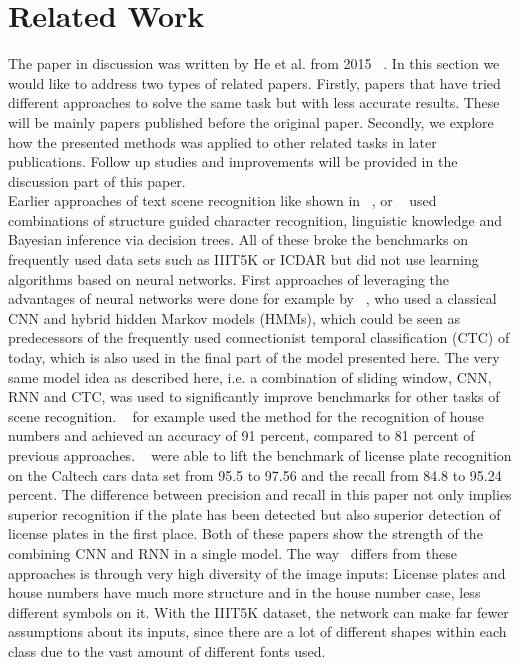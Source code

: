 \documentclass{utue} %
\begin{document}
\section{Related Work}
The paper in discussion was written by He et al. from 2015 ~\cite{2015arXiv150604395H}. In this section we would like to address two types of related papers. Firstly, papers that have tried different approaches to solve the same task but with less accurate results. These will be mainly papers published before the original paper. Secondly, we explore how the presented methods was applied to other related tasks in later publications. Follow up studies and improvements will be provided in the discussion part of this paper. \\
Earlier approaches of text scene recognition like shown in ~\cite{Mishra2012a}, or ~\cite{6727574} used combinations of structure guided character recognition, linguistic knowledge and Bayesian inference via decision trees. All of these broke the benchmarks on frequently used data sets such as IIIT5K or ICDAR but did not use learning algorithms based on neural networks. First approaches of leveraging the advantages of neural networks were done for example by ~\cite{DBLP:journals/corr/AlsharifP13}, who used a classical CNN and hybrid hidden Markov models (HMMs), which could be seen as predecessors of the frequently used connectionist temporal classification (CTC) of today, which is also used in the final part of the model presented here.
The very same model idea as described here, i.e. a combination of sliding window, CNN, RNN and CTC, was used to significantly improve benchmarks for other tasks of scene recognition. ~\cite{DBLP:journals/corr/GuoTLL16} for example used the method for the recognition of house numbers and achieved an accuracy of 91 percent, compared to 81 percent of previous approaches. ~\cite{DBLP:journals/corr/LiS16} were able to lift the benchmark of license plate recognition on the Caltech cars data set from 95.5 to 97.56 and the recall from 84.8 to 95.24 percent. The difference between precision and recall in this paper not only implies superior recognition if the plate has been detected but also superior detection of license plates in the first place. Both of these papers show the strength of the combining CNN and RNN in a single model. The way~\cite{2015arXiv150604395H} differs from these approaches is through very high diversity of the image inputs: License plates and house numbers have much more structure and in the house number case, less different symbols on it. With the IIIT5K dataset, the network can make far fewer assumptions about its inputs, since there are a lot of different shapes within each class due to the vast amount of different fonts used.
\end{document}
